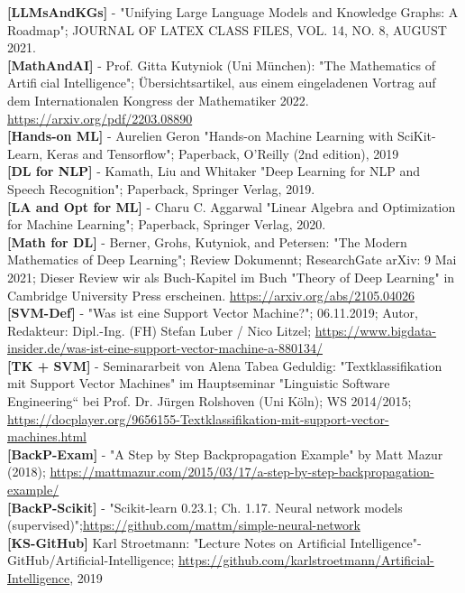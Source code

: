 \documentclass[12pt]{article}
\begin{document}
%
\textbf{[LLMsAndKGs]} - "Unifying Large Language Models and Knowledge Graphs: A Roadmap"; JOURNAL OF LATEX CLASS FILES, VOL. 14, NO. 8, AUGUST 2021.\\[0.2cm] 
%
\textbf{[MathAndAI]} - Prof. Gitta Kutyniok (Uni München): "The Mathematics of Artificial Intelligence"; Übersichtsartikel, aus einem eingeladenen Vortrag auf dem Internationalen Kongress der Mathematiker 2022. \url{https://arxiv.org/pdf/2203.08890} \\[0.2cm]
%
\textbf{[Hands-on ML]} - Aurelien Geron "Hands-on Machine Learning with SciKit-Learn, Keras and Tensorflow"; Paperback, O'Reilly (2nd edition), 2019\\[0.2cm] 
%
\textbf{[DL for NLP]} - Kamath, Liu and Whitaker "Deep Learning for NLP and Speech Recognition"; Paperback, Springer Verlag, 2019.\\[0.2cm] 
%
\textbf{[LA and Opt for ML]} - Charu C. Aggarwal "Linear Algebra and Optimization for Machine Learning"; Paperback, Springer Verlag, 2020.\\[0.2cm] 
%
\textbf{[Math for DL]} - Berner, Grohs, Kutyniok, and Petersen: "The Modern Mathematics of Deep Learning"; Review Dokumennt; ResearchGate arXiv: 9 Mai 2021; Dieser Review wir als Buch-Kapitel im Buch  "Theory of Deep Learning" in Cambridge University Press erscheinen. \url{https://arxiv.org/abs/2105.04026} \\[0.2cm] 
%
\textbf{[SVM-Def]} - "Was ist eine Support Vector Machine?"; 06.11.2019; Autor, Redakteur: Dipl.-Ing. (FH) Stefan Luber / Nico Litzel; \url{https://www.bigdata-insider.de/was-ist-eine-support-vector-machine-a-880134/}\\[0.2cm] 
%
\textbf{[TK + SVM]} - Seminararbeit von Alena Tabea Geduldig: "Textklassifikation mit Support Vector Machines" im  Hauptseminar "Linguistic Software Engineering“ bei Prof. Dr. Jürgen Rolshoven (Uni Köln); WS 2014/2015; \url{https://docplayer.org/9656155-Textklassifikation-mit-support-vector-machines.html}\\[0.2cm] 
%
\textbf{[BackP-Exam]} - "A Step by Step Backpropagation Example" by Matt Mazur (2018); \url{https://mattmazur.com/2015/03/17/a-step-by-step-backpropagation-example/}\\[0.2cm] 
%
\textbf{[BackP-Scikit]} - "Scikit-learn 0.23.1; Ch. 1.17. Neural network models (supervised)";\url{https://github.com/mattm/simple-neural-network}\\[0.2cm] 
%
\textbf{[KS-GitHub]} Karl Stroetmann: "Lecture Notes on Artificial Intelligence"-  GitHub/Artificial-Intelligence; \url{https://github.com/karlstroetmann/Artificial-Intelligence}, 2019\\[0.2cm]  
\end{document}

